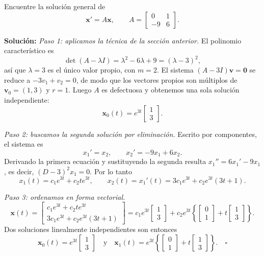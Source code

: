 \begin{example}\label{ex:nodo1}
Encuentre la soluci\'on general de
\begin{equation}\label{eq:nodo1}
\mathbf{x}' = A\mathbf{x}, \qquad A = \begin{bmatrix} 0 & 1 \\ -9 & 6 \end{bmatrix}.
\end{equation}

\textbf{Soluci\'on:} \emph{Paso 1: aplicamos la t\'ecnica de la secci\'on anterior.} El polinomio caracter\'istico es
\[
\det(A-\lambda I)=\lambda^2-6\lambda+9=(\lambda-3)^2,
\]
as\'i que $\lambda=3$ es el \'unico valor propio, con $m=2$. El sistema $(A-3I)\mathbf v=\mathbf 0$ se reduce a $-3v_1+v_2=0$, de modo que los vectores propios son m\'ultiplos de $\mathbf v_0=(1,3)$ y $r=1$. Luego $A$ es defectuosa y obtenemos una sola soluci\'on independiente:
\begin{equation}\label{eq:x0-nodo1}
\mathbf{x}_0(t) = e^{3t} \begin{bmatrix} 1 \\ 3 \end{bmatrix}.
\end{equation}

\emph{Paso 2: buscamos la segunda soluci\'on por eliminaci\'on.} Escrito por componentes, el sistema es
\[
x_1' = x_2, \qquad x_2' = -9x_1 + 6x_2.
\]
Derivando la primera ecuaci\'on y sustituyendo la segunda resulta $x_1''=6x_1'-9x_1$, es decir, $(D-3)^2x_1=0$. Por lo tanto
\[
x_1(t) = c_1 e^{3t} + c_2 t e^{3t}, \qquad x_2(t)=x_1'(t) = 3c_1 e^{3t} + c_2 e^{3t}(3t + 1).
\]

\emph{Paso 3: ordenamos en forma vectorial.}
\[
\mathbf{x}(t) = \begin{bmatrix} c_1 e^{3t} + c_2 t e^{3t} \\ 3c_1 e^{3t} + c_2 e^{3t}(3t + 1) \end{bmatrix}
= c_1 e^{3t} \begin{bmatrix} 1 \\ 3 \end{bmatrix} + c_2 e^{3t} \left\{ \begin{bmatrix} 0 \\ 1 \end{bmatrix} + t \begin{bmatrix} 1 \\ 3 \end{bmatrix} \right\}.
\]
Dos soluciones linealmente independientes son entonces
\[
\mathbf{x}_0(t) = e^{3t} \begin{bmatrix} 1 \\ 3 \end{bmatrix} \quad \text{y} \quad \mathbf{x}_1(t) = e^{3t} \left\{ \begin{bmatrix} 0 \\ 1 \end{bmatrix} + t \begin{bmatrix} 1 \\ 3 \end{bmatrix} \right\}. \quad \square
\]
\end{example}

